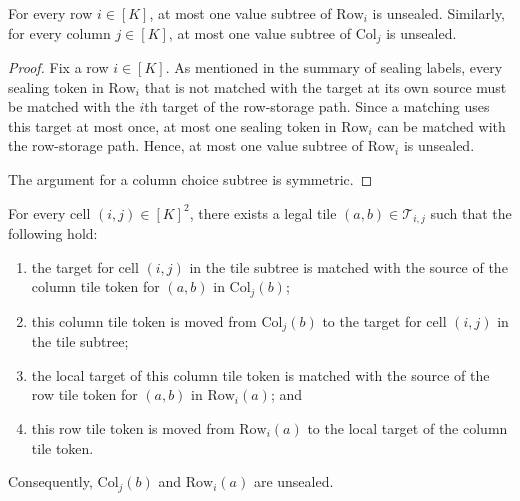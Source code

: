 \documentclass[a4paper,USenglish,thm-restate]{lipics-v2021}
\newcommand{\rowsub}{\mathrm{Row}}
\newcommand{\colsub}{\mathrm{Col}}
\theoremstyle{problemstyle}
\begin{document}
\begin{lemma}\label{lem:at-most-one-unsealed-value-subtree}
For every row $i\in[K]$, at most one value subtree of $\rowsub_i$ is unsealed. Similarly, for every column $j\in[K]$, at most one value subtree of $\colsub_j$ is unsealed.
\end{lemma}

\begin{proof}
Fix a row $i\in[K]$. As mentioned in the summary of sealing labels, every sealing token in $\rowsub_i$ that is not matched with the target at its own source must be matched with the $i$th target of the row-storage path. Since a matching uses this target at most once, at most one sealing token in $\rowsub_i$ can be matched with the row-storage path. Hence, at most one value subtree of $\rowsub_i$ is unsealed.

The argument for a column choice subtree is symmetric.
\end{proof}

\begin{lemma}\label{lem:cell-verification}
For every cell $(i,j)\in[K]^2$, there exists a legal tile $(a,b)\in \mathcal{T}_{i,j}$ such that the following hold:
\begin{enumerate}
\item the target for cell $(i,j)$ in the tile subtree is matched with the source of the column tile token for $(a,b)$ in $\colsub_j(b)$;
\item this column tile token is moved from $\colsub_j(b)$ to the target for cell $(i,j)$ in the tile subtree;
\item the local target of this column tile token is matched with the source of the row tile token for $(a,b)$ in $\rowsub_i(a)$; and
\item this row tile token is moved from $\rowsub_i(a)$ to the local target of the column tile token.
\end{enumerate}
Consequently, $\colsub_j(b)$ and $\rowsub_i(a)$ are unsealed.
\end{lemma}
\end{document}
